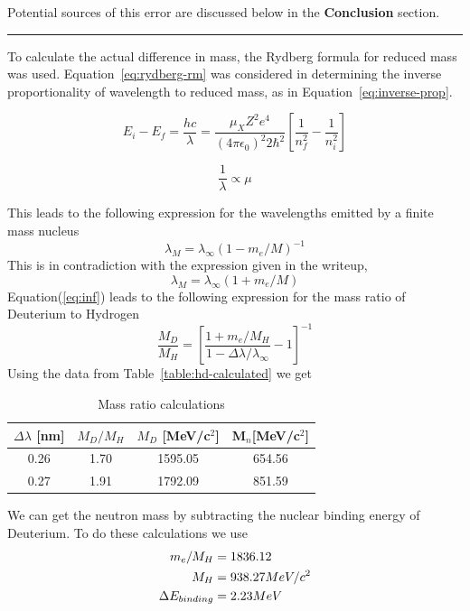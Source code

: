 \documentclass[paper=a4, fontsize=11pt]{scrartcl} %
\numberwithin{equation}{section}
\numberwithin{figure}{section}
\numberwithin{table}{section}
\begin{document}
Potential sources of this error are discussed below in the \textbf{Conclusion} section.

\vspace{1.5em}
\hrule
\vspace{1.7em}

To calculate the actual difference in mass, the Rydberg formula for reduced mass was used. Equation~\ref{eq:rydberg-rm} was considered in determining the inverse proportionality of wavelength to reduced mass, as in Equation~\ref{eq:inverse-prop}.

\begin{equation}
\label{eq:rydberg-rm}
E_i - E_f = \dfrac{hc}{\lambda} = \dfrac{\mu_X Z^2 e^4}{\left( 4 \pi \epsilon_0 \right)^2 2 \hbar^2} \left[ \dfrac{1}{n^2_f} - \dfrac{1}{n_i^2} \right]
\end{equation}

\begin{equation}
\label{eq:inverse-prop}
\dfrac{1}{\lambda} \propto \mu
\end{equation}

This leads to the following expression for the wavelengths emitted by
a finite mass nucleus
\begin{equation}
  \label{eq:inf}
  \lambda_M = \lambda_{\infty}(1-m_e/M)^{-1}
\end{equation}
This is in contradiction with the expression given in the
writeup\cite{writeup},
\begin{equation}
  \label{eq:writeup}
  \lambda_M = \lambda_{\infty}(1+m_e/M)
\end{equation}
Equation(\ref{eq:inf}) leads to the following expression for the mass
ratio of Deuterium to Hydrogen
\begin{equation}
  \label{eq:ratio}
  \frac{M_D}{M_H} =
  \left[
    \frac{1+m_e/M_H}{1-\Delta\lambda/\lambda_{\infty}}-1
  \right]^{-1}
\end{equation}
Using the data from Table~\ref{table:hd-calculated} we get
\begin{table}[h]
  \centering
  \begin{tabular}{|| c | ccc ||} \hline \hline
    $\Delta \lambda$ [nm] & $M_D/M_H$ & $M_D$ [MeV/c$^2$] & M$_n$[MeV/c$^2$]\\ \hline
    0.26 & 1.70 & 1595.05 & 654.56 \\
    0.27 & 1.91 & 1792.09 & 851.59 \\ \hline \hline
  \end{tabular}
  \caption{Mass ratio calculations}
  \label{tab:ratio}
\end{table}
We can get the neutron mass by subtracting the nuclear binding energy
of Deuterium. To do these calculations we use 
\begin{align}
\begin{split}
  \label{eq:things}
  \centering
  m_e/M_H &= 1836.12\\
  M_H & = 938.27 MeV/c^2\\
  \Delta E_{binding} & = 2.23 MeV
\end{split}
\end{align}
\end{document}
